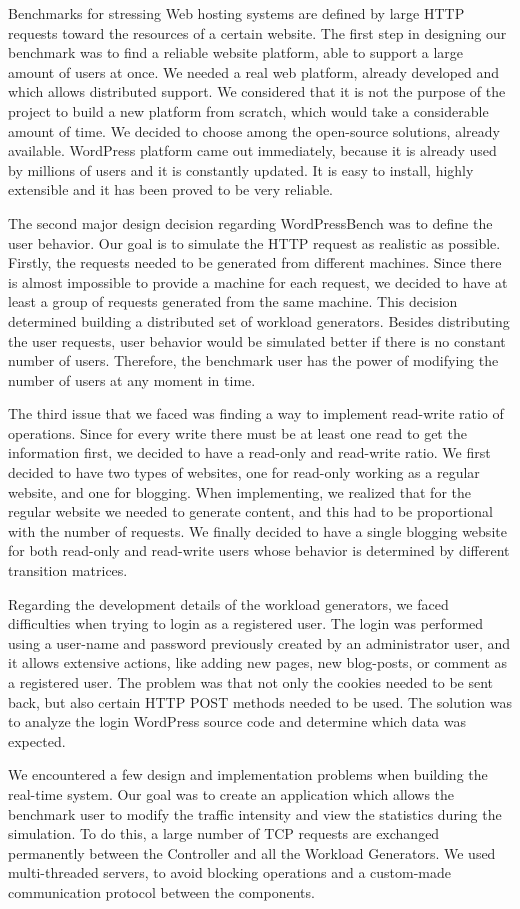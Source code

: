 Benchmarks for stressing Web hosting systems are defined by large HTTP requests toward the resources of a certain website. The first step in designing our benchmark was to find a reliable website platform, able to support a large amount of users at once. We needed a real web platform, already developed and which allows distributed support. We considered that it is not the purpose of the project to build a new platform from scratch, which would take a considerable amount of time. We decided to choose among the open-source solutions, already available. WordPress platform came out immediately, because it is already used by millions of users and it is constantly updated. It is easy to install, highly extensible and it has been proved to be very reliable.

The second major design decision regarding WordPressBench was to define the user behavior. Our goal is to simulate the HTTP request as realistic as possible. Firstly, the requests needed to be generated from different machines. Since there is almost impossible to provide a machine for each request, we decided to have at least a group of requests generated from the same machine. This decision determined building a distributed set of workload generators. Besides distributing the user requests, user behavior would be simulated better if there is no constant number of users. Therefore, the benchmark user has the power of modifying the number of users at any moment in time.

The third issue that we faced was finding a way to implement read-write ratio of operations. Since for every write there must be at least one read to get the information first, we decided to have a read-only and read-write ratio. We first decided to have two types of websites, one for read-only working as a regular website, and one for blogging. When implementing, we realized that for the regular website we needed to generate content, and this had to be proportional with the number of requests. We finally decided to have a single blogging website for both read-only and read-write users whose behavior is determined by different transition matrices.

Regarding the development details of the workload generators, we faced difficulties when trying to login as a registered user. The login was performed using a user-name and password previously created by an administrator user, and it allows extensive actions, like adding new pages, new blog-posts, or comment as a registered user. The problem was that not only the cookies needed to be sent back, but also certain HTTP POST methods needed to be used. The solution was to analyze the login WordPress source code and determine which data was expected. 

We encountered a few design and implementation problems when building the real-time system. Our goal was to create an application which allows the benchmark user to modify the traffic intensity and view the statistics during the simulation. To do this, a large number of TCP requests are exchanged permanently between the Controller and all the Workload Generators. We used multi-threaded servers, to avoid blocking operations and a custom-made communication protocol between the components.
